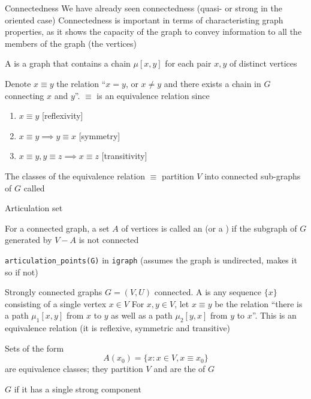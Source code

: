 \documentclass[aspectratio=169]{beamer}\usepackage[]{graphicx}\usepackage[]{xcolor}
\begin{document}
\begin{frame}{Connectedness}
We have already seen connectedness (quasi- or strong in the oriented case)
\vfill
Connectedness is important in terms of characteristing graph properties, as it shows the capacity of the graph to convey information to all the members of the graph (the vertices)
\end{frame}


\begin{frame}
	\begin{definition}
	A  is a graph that contains a chain $\mu[x,y]$ for each pair $x,y$ of distinct vertices
	\end{definition}
	\vfill
	Denote $x\equiv y$ the relation  ``$x=y$, or $x\neq y$ and there exists a chain in $G$ connecting $x$ and $y$''. $\equiv$ is an equivalence relation since
	\begin{enumerate}
		\item $x\equiv y$ \hfill[reflexivity]
		\item $x\equiv y\implies y\equiv x$ \hfill[symmetry]
		\item $x\equiv y, y\equiv z\implies x\equiv z$ \hfill[transitivity]
	\end{enumerate}
	\begin{definition}
	The classes of the equivalence relation $\equiv$ partition $V$ into connected sub-graphs of $G$ called 
	\end{definition}
	\end{frame}
	
\begin{frame}{Articulation set} 
	\begin{definition}
	For a connected graph, a set $A$ of vertices is called an  (or a ) if the subgraph of $G$ generated by $V-A$ is not connected
	\end{definition}
	\vfill
	{\tt articulation\_points(G)} in {\tt igraph} (assumes the graph is undirected, makes it so if not)
\end{frame}

	
	\begin{frame}{Strongly connected graphs}
		$G=(V,U)$ connected. 
		A  is any sequence $\{x\}$ consisting of a single vertex $x\in V$
		\vfill
		For $x,y\in V$, let $x\equiv y$ be the relation ``there is a path $\mu_1[x,y]$ from $x$ to $y$ as well as a path $\mu_2[y,x]$ from $y$ to $x$''. This is an equivalence relation (it is reflexive, symmetric and transitive)
		\vfill
		\begin{definition}\label{def:strong_components}
		Sets of the form 
		\[
		A(x_0)=\{x:x\in V, x\equiv x_0\}	
		\]
		are equivalence classes; they partition $V$ and are the  of $G$	
		\end{definition}
		\vfill
		\begin{definition}
		\label{def:strongly_connected_graph}
		$G$  if it has a single strong component
		\end{definition}
\end{frame}
		
\end{document}
